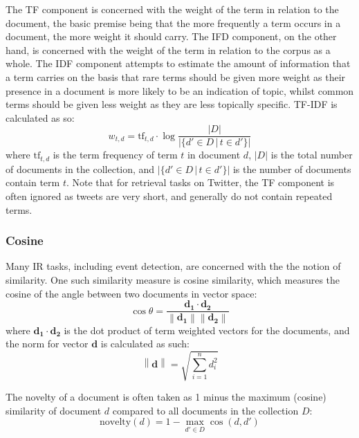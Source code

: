 The TF component is concerned with the weight of the term in relation to the document, the basic premise being that the more frequently a term occurs in a document, the more weight it should carry.
The IFD component, on the other hand, is concerned with the weight of the term in relation to the corpus as a whole.
The IDF component attempts to estimate the amount of information that a term carries on the basis that rare terms should be given more weight as their presence in a document is more likely to be an indication of topic, whilst common terms should be given less weight as they are less topically specific.
TF-IDF is calculated as so:
\begin{displaymath}
	w_{t,d} = \mathrm{tf}_{t,d} \cdot \log{\frac{|D|}{|\{d' \in D \, | \, t \in d'\}|}}
\end{displaymath}
where \(\mathrm{tf}_{t,d}\) is the term frequency of term \(t\) in document \(d\), \(|D|\) is the total number of documents in the collection, and \(|\{d' \in D \, | \, t \in d'\}|\) is the number of documents contain term \(t\).
Note that for retrieval tasks on Twitter, the TF component is often ignored as tweets are very short, and generally do not contain repeated terms.

\subsubsection{Cosine}

Many IR tasks, including event detection, are concerned with the the notion of similarity.
One such similarity measure is cosine similarity, which measures the cosine of the angle between two documents in vector space:
\begin{displaymath}
	\cos{\theta} = \frac{\mathbf{d_1} \cdot \mathbf{d_2}}{\left\| \mathbf{d_1} \right\| \left \| \mathbf{d_2} \right\|}
\end{displaymath}
where \(\mathbf{d_1} \cdot \mathbf{d_2}\) is the dot product of term weighted vectors for the documents, and the norm for vector \(\mathbf{d}\) is calculated as such:
\begin{displaymath}
	\left\| \mathbf{d} \right\| = \sqrt{\sum_{i=1}^n d_i^2}
\end{displaymath}

The novelty of a document is often taken as 1 minus the maximum (cosine) similarity of document \(d\) compared to all documents in the collection \(D\):
\begin{displaymath}
	\text{novelty}(d) = 1 - \max_{d' \in D} \cos(d, d')
\end{displaymath}

